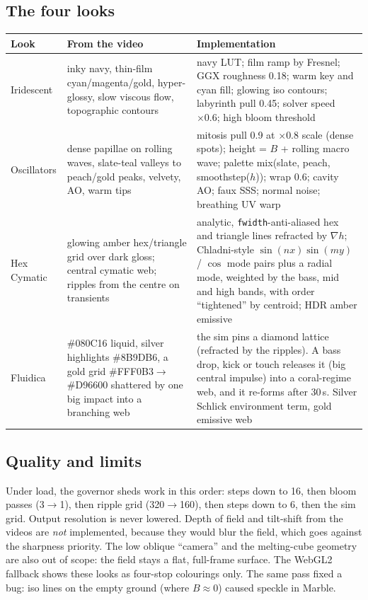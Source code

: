 \documentclass[10pt,a4paper]{article}
\newcommand{\code}[1]{\texttt{\small #1}}
\begin{document}
\subsection{The four looks}
\begin{center}\small
\begin{tabularx}{\linewidth}{@{}l L L@{}}
\toprule
Look & From the video & Implementation\\
\midrule
Iridescent & inky navy, thin-film cyan/magenta/gold, hyper-glossy, slow viscous flow, topographic contours & navy LUT; film ramp by Fresnel; GGX roughness 0.18; warm key and cyan fill; glowing iso contours; labyrinth pull 0.45; solver speed $\times0.6$; high bloom threshold\\
Oscillators & dense papillae on rolling waves, slate-teal valleys to peach/gold peaks, velvety, AO, warm tips & mitosis pull 0.9 at $\times0.8$ scale (dense spots); height = $B$ + rolling macro wave; palette mix(slate, peach, smoothstep($h$)); wrap 0.6; cavity AO; faux SSS; normal noise; breathing UV warp\\
Hex Cymatic & glowing amber hex/triangle grid over dark gloss; central cymatic web; ripples from the centre on transients & analytic, \code{fwidth}-anti-aliased hex and triangle lines refracted by $\nabla h$; Chladni-style $\sin(nx)\sin(my)$ / $\cos$ mode pairs plus a radial mode, weighted by the bass, mid and high bands, with order ``tightened'' by centroid; HDR amber emissive\\
Fluidica & \#080C16 liquid, silver highlights \#8B9DB6, a gold grid \#FFF0B3$\to$\#D96600 shattered by one big impact into a branching web & the sim pins a diamond lattice (refracted by the ripples). A bass drop, kick or touch releases it (big central impulse) into a coral-regime web, and it re-forms after 30\,s. Silver Schlick environment term, gold emissive web\\
\bottomrule
\end{tabularx}\end{center}

\subsection{Quality and limits}
Under load, the governor sheds work in this order: steps down to 16, then bloom passes (3$\to$1), then ripple grid (320$\to$160), then steps down to 6, then the sim grid.
Output resolution is never lowered. Depth of field and tilt-shift from the videos are \emph{not} implemented, because they would blur the field, which goes against the
sharpness priority. The low oblique ``camera'' and the melting-cube geometry are also out of scope: the field stays a flat, full-frame surface. The WebGL2 fallback shows these looks as four-stop colourings only.
The same pass fixed a bug: iso lines on the empty ground (where $B\approx0$) caused speckle in Marble.
\end{document}
